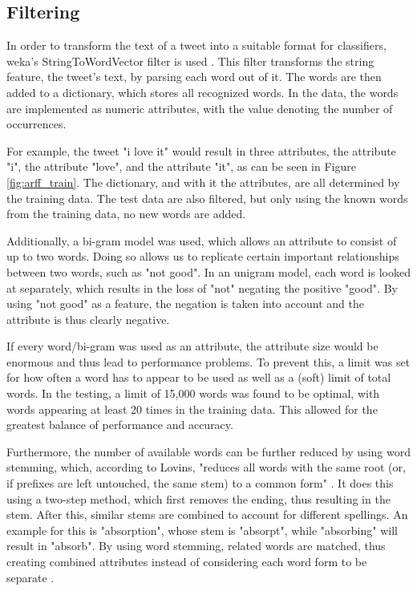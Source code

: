 \subsection{Filtering}
In order to transform the text of a tweet into a suitable format for classifiers, weka's StringToWordVector filter is used \cite{weka}. This filter transforms the string feature, the tweet's text, by parsing each word out of it. The words are then added to a dictionary, which stores all recognized words. In the data, the words are implemented as numeric attributes, with the value denoting the number of occurrences.

For example, the tweet "i love it" would result in three attributes, the attribute "i", the attribute "love", and the attribute "it", as can be seen in Figure \ref{fig:arff_train}. The dictionary, and with it the attributes, are all determined by the training data. The test data are also filtered, but only using the known words from the training data, no new words are added. 


Additionally, a bi-gram model was used, which allows an attribute to consist of up to two words. Doing so allows us to replicate certain important relationships between two words, such as "not good". In an unigram model, each word is looked at separately, which results in the loss of "not" negating the positive "good". By using "not good" as a feature, the negation is taken into account and the attribute is thus clearly negative.

If every word/bi-gram was used as an attribute, the attribute size would be enormous and thus lead to performance problems. To prevent this, a limit was set for how often a word has to appear to be used as well as a (soft) limit of total words. In the testing, a limit of 15,000 words was found to be optimal, with words appearing at least 20 times in the training data. This allowed for the greatest balance of performance and accuracy.


Furthermore, the number of available words can be further reduced by using word stemming, which, according to Lovins, "reduces all words with the same root (or, if prefixes are left untouched, the same stem) to a common form" \cite[p.~22]{Lovins1968DevelopmentOA}. It does this using a two-step method, which first removes the ending, thus resulting in the stem. After this, similar stems are combined to account for different spellings. An example for this is "absorption", whose stem is "absorpt", while "absorbing" will result in "absorb". By using word stemming, related words are matched, thus creating combined attributes instead of considering each word form to be separate \cite{Lovins1968DevelopmentOA}.

